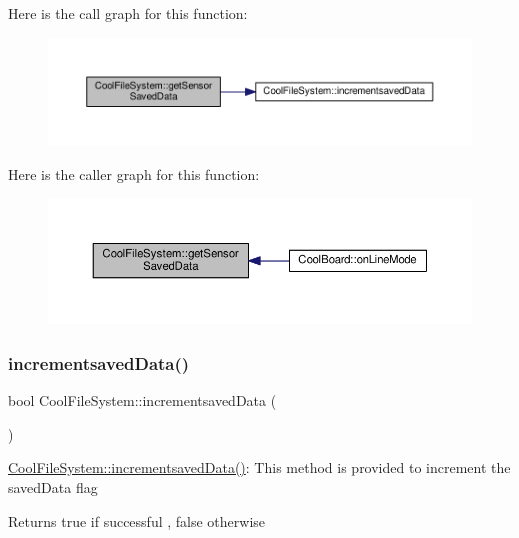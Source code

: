 Here is the call graph for this function\+:\nopagebreak
\begin{figure}[H]
\begin{center}
\leavevmode
\includegraphics[width=350pt]{class_cool_file_system_a3223ffff4266a6300988fab956d6b4b2_cgraph}
\end{center}
\end{figure}
Here is the caller graph for this function\+:\nopagebreak
\begin{figure}[H]
\begin{center}
\leavevmode
\includegraphics[width=350pt]{class_cool_file_system_a3223ffff4266a6300988fab956d6b4b2_icgraph}
\end{center}
\end{figure}
\mbox{\label{class_cool_file_system_aae045125288f255f3e258073dcada2a6}} 
\subsubsection{\texorpdfstring{incrementsaved\+Data()}{incrementsavedData()}}
{\footnotesize\ttfamily bool Cool\+File\+System\+::incrementsaved\+Data (\begin{DoxyParamCaption}{ }\end{DoxyParamCaption})}

\hyperlink{class_cool_file_system_aae045125288f255f3e258073dcada2a6}{Cool\+File\+System\+::incrementsaved\+Data()}\+: This method is provided to increment the saved\+Data flag

\begin{DoxyReturn}{Returns}
true if successful , false otherwise 
\end{DoxyReturn}



